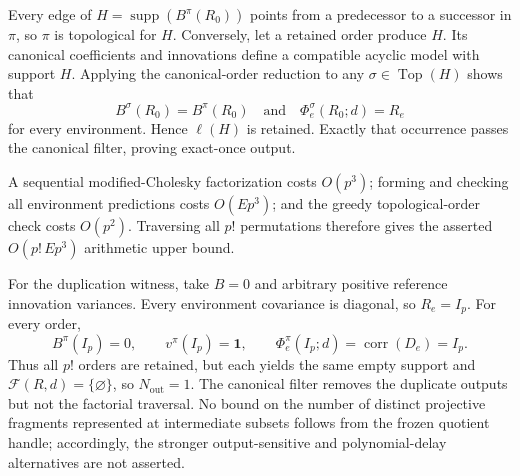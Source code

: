 Every edge of \(H=\operatorname{supp}(B^\pi(R_0))\) points from a predecessor to a successor in \(\pi\), so \(\pi\) is topological for \(H\).  Conversely, let a retained order produce \(H\).  Its canonical coefficients and innovations define a compatible acyclic model with support \(H\).  Applying the canonical-order reduction to any \(\sigma\in\operatorname{Top}(H)\) shows that
\[
 B^\sigma(R_0)=B^\pi(R_0)
 \quad\text{and}\quad
 \Phi_e^\sigma(R_0;d)=R_e
\]
for every environment.  Hence \(\ell(H)\) is retained.  Exactly that occurrence passes the canonical filter, proving exact-once output.

A sequential modified-Cholesky factorization costs \(O(p^3)\); forming and checking all environment predictions costs \(O(Ep^3)\); and the greedy topological-order check costs \(O(p^2)\).  Traversing all \(p!\) permutations therefore gives the asserted \(O(p!\,Ep^3)\) arithmetic upper bound.

For the duplication witness, take \(B=0\) and arbitrary positive reference innovation variances.  Every environment covariance is diagonal, so \(R_e=I_p\).  For every order,
\[
 B^\pi(I_p)=0,\qquad v^\pi(I_p)=\mathbf 1,
 \qquad \Phi_e^\pi(I_p;d)=\operatorname{corr}(D_e)=I_p.
\]
Thus all \(p!\) orders are retained, but each yields the same empty support and
\(\mathcal F(R,d)=\{\varnothing\}\), so \(N_{\mathrm{out}}=1\).  The canonical filter removes the duplicate outputs but not the factorial traversal.  No bound on the number of distinct projective fragments represented at intermediate subsets follows from the frozen quotient handle; accordingly, the stronger output-sensitive and polynomial-delay alternatives are not asserted.
